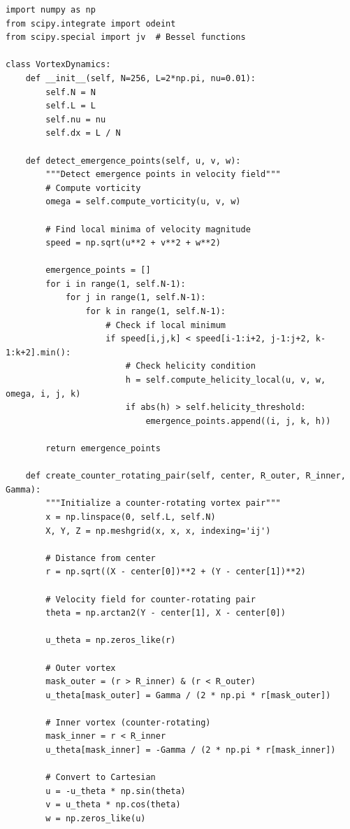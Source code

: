 \documentclass[12pt]{article}
\begin{document}
\begin{lstlisting}[caption={Vortex Dynamics Simulation Framework}]
import numpy as np
from scipy.integrate import odeint
from scipy.special import jv  # Bessel functions

class VortexDynamics:
    def __init__(self, N=256, L=2*np.pi, nu=0.01):
        self.N = N
        self.L = L
        self.nu = nu
        self.dx = L / N
        
    def detect_emergence_points(self, u, v, w):
        """Detect emergence points in velocity field"""
        # Compute vorticity
        omega = self.compute_vorticity(u, v, w)
        
        # Find local minima of velocity magnitude
        speed = np.sqrt(u**2 + v**2 + w**2)
        
        emergence_points = []
        for i in range(1, self.N-1):
            for j in range(1, self.N-1):
                for k in range(1, self.N-1):
                    # Check if local minimum
                    if speed[i,j,k] < speed[i-1:i+2, j-1:j+2, k-1:k+2].min():
                        # Check helicity condition
                        h = self.compute_helicity_local(u, v, w, omega, i, j, k)
                        if abs(h) > self.helicity_threshold:
                            emergence_points.append((i, j, k, h))
        
        return emergence_points
    
    def create_counter_rotating_pair(self, center, R_outer, R_inner, Gamma):
        """Initialize a counter-rotating vortex pair"""
        x = np.linspace(0, self.L, self.N)
        X, Y, Z = np.meshgrid(x, x, x, indexing='ij')
        
        # Distance from center
        r = np.sqrt((X - center[0])**2 + (Y - center[1])**2)
        
        # Velocity field for counter-rotating pair
        theta = np.arctan2(Y - center[1], X - center[0])
        
        u_theta = np.zeros_like(r)
        
        # Outer vortex
        mask_outer = (r > R_inner) & (r < R_outer)
        u_theta[mask_outer] = Gamma / (2 * np.pi * r[mask_outer])
        
        # Inner vortex (counter-rotating)
        mask_inner = r < R_inner
        u_theta[mask_inner] = -Gamma / (2 * np.pi * r[mask_inner])
        
        # Convert to Cartesian
        u = -u_theta * np.sin(theta)
        v = u_theta * np.cos(theta)
        w = np.zeros_like(u)
        

\end{lstlisting}
\end{document}
